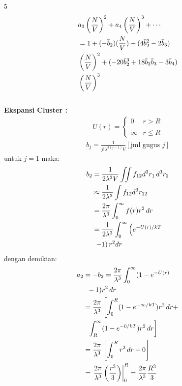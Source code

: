 \documentclass[a4paper  , 6 pt]{article}
\begin{document}
\begin{tiny}
\begin{multicols} {5}
\begin{align}
 &  a_3 \left( \frac{N}{V}\right)^2 +
a_4  \left( \frac{N}{V}\right)^3 + \cdots \nonumber \\
& = 1 + (- \bar{b}_2 )(\frac{N}{V}) +   (4 \bar{b}_2^2 - 2 \bar{b}_3) \nonumber \\
& \left( \frac{N}{V}\right)^2 
  + (- 20 \bar{b}_2^3 + 18 \bar{b}_2 \bar{b}_3  - 3 \bar{b}_4) \nonumber \\
  &  \left( \frac{N}{V}\right)^3 
\end{align}\\
\textbf{Ekspansi Cluster :} \\
\begin{align}
U(r) = \left\{ 
\begin{array}{ll}
0 & r > R \\
& \\
\infty & r\le R
\end{array}
 \right.
\end{align}
\begin{align}
b_j = \frac{1}{j! \lambda^{3 (j -1) }V} [\text{jml gugus }j]
\end{align}
untuk $j = 1$ maka:
\begin{align}
b_2&= \frac{1}{2 \lambda^3 V} \iint f_{12} d^3r_1 \, d^3 r_2 \nonumber \\
& \approx \frac{1}{2 \lambda^3} \int f_{12} d^3 r_{12} \nonumber \\
&  = \frac{2\pi}{\lambda^3} \int_{0}^{\infty } f(r) r^2 \, dr \nonumber \\
& = \frac{1}{2 \lambda^3 } \int_{ 0}^{\infty } \left( e^{- U(r)/kT} \right. \nonumber \\
& \hspace{0.1 cm } \left.  -1 \right) r^2  dr  
\end{align}
dengan demikian:
\begin{align}
a_2 & = - b_2  = \frac{2\pi}{\lambda^3} \int_{0}^{\infty} (1 - e^{- U(r)} \nonumber \\
& \hspace{0.2 cm } - 1)r^2 \, dr \nonumber \\
& = \frac{2\pi }{\lambda^3} \left[ \int_0^R (1 - e^{- \infty /kT}) r^2 \, dr + \right. \nonumber \\
& \hspace{0.2 cm } \left.  \int_{R}^{\infty } (1 - e^{- 0 /kT} )r^2 \, dr  \right]  \nonumber \\
& = \frac{2 \pi }{\lambda^3} \left [ \int_{0}^{R} r^2 \, dr  + 0 \right ]  \nonumber \\
& = \left. \frac{2 \pi }{\lambda^3} \left( \frac{r^3}{3}\right)\right |_0^R  = \frac{2 \pi }{\lambda^3} \frac{R^3}{3} \nonumber \\

\end{align}
\end{multicols}
\end{tiny}
\end{document}
